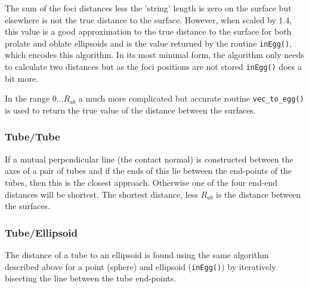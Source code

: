 {{{{{The sum of the foci distances less the 'string' length is zero on the surface but elsewhere is not
the true distance to the surface.  However, when scaled by 1.4, this value is a good approximation
to the true distance to the surface for both prolate and oblate ellipsoids and is the value returned
by the routine {\tt inEgg()}, which encodes this algorithm.   In its most minimal form, the algorithm
only needs to calculate two distances but as the foci positions are not stored {\tt inEgg()} does
a bit more. 

In the range $0\ldots R_{ab}$ a much more complicated but accurate routine {\tt vec\_to\_egg()} is
used to return the true value of the distance between the surfaces.

\subsubsection{Tube/Tube}

If a mutual perpendicular line (the contact normal) is constructed between the axes of a pair
of tubes and if the ends of this lie between the end-points of the tubes, then this is the
closest approach.   Otherwise one of the four end-end distances will be shortest.   The shortest
distance, less $R_{ab}$ is the distance between the surfaces.

\subsubsection{Tube/Ellipsoid}

The distance of a tube to an ellipsoid is found using the same algorithm described above
for a point (sphere) and ellipsoid ({\tt inEgg()}) by iteratively bisecting the line between the
tube end-points.

}}}}}

